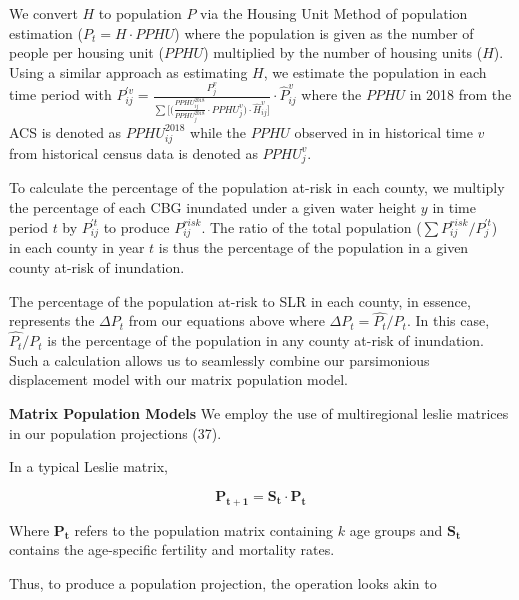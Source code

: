 \documentclass[9pt,twocolumn,twoside,]{pnas-new}
\begin{document}
We convert \(H\) to population \(P\) via the Housing Unit Method of
population estimation (\(P_t = H \cdot PPHU\)) where the population is
given as the number of people per housing unit (\(PPHU\)) multiplied by
the number of housing units (\(H\)). Using a similar approach as
estimating \(H\), we estimate the population in each time period with
\(P^{'v}_{ij} = \frac{P^v_j}{\sum \Big[ \Big( \frac{PPHU_{ij}^{2018}}{PPHU_j^{2018}} \cdot PPHU_j^v \Big) \cdot \hat{H}^v_{ij} \Big]} \cdot \hat{P}^v_{ij}\)
where the \(PPHU\) in 2018 from the ACS is denoted as
\(PPHU^{2018}_{ij}\) while the \(PPHU\) observed in in historical time
\(v\) from historical census data is denoted as \(PPHU_j^v\).

To calculate the percentage of the population at-risk in each county, we
multiply the percentage of each CBG inundated under a given water height
\(y\) in time period \(t\) by \(P^{'t}_{ij}\) to produce
\(P^{risk}_{ij}\). The ratio of the total population
(\(\sum{P^{risk}_{ij}}/P^{'t}_{j}\)) in each county in year \(t\) is
thus the percentage of the population in a given county at-risk of
inundation.

The percentage of the population at-risk to SLR in each county, in
essence, represents the \(\Delta P_t\) from our equations above where
\(\Delta P_t = \hat{P_t}/P_t\). In this case, \(\hat{P_t}/P_t\) is the
percentage of the population in any county at-risk of inundation. Such a
calculation allows us to seamlessly combine our parsimonious
displacement model with our matrix population model.

\textbf{Matrix Population Models} We employ the use of multiregional
leslie matrices in our population projections (37).

In a typical Leslie matrix,

\begin{equation}
    \mathbf{P_{t+1}} = \mathbf{S_t} \cdot \mathbf{P_t} \label{eq:lesliematrix_base} \tag{5}
\end{equation}

Where \(\mathbf{P_t}\) refers to the population matrix containing \(k\)
age groups and \(\mathbf{S_t}\) contains the age-specific fertility and
mortality rates.

Thus, to produce a population projection, the operation looks akin to
\end{document}
